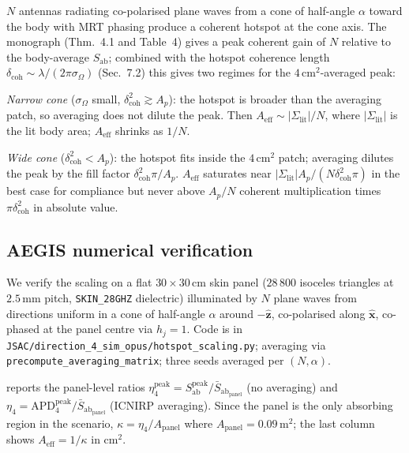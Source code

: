 \documentclass[journal]{IEEEtran}
\newcommand{\Sab}{S_{\mathrm{ab}}}
\newcommand{\APD}{\mathrm{APD}}
\newcommand{\Aeff}{A_{\mathrm{eff}}}
\begin{document}
$N$ antennas radiating co-polarised plane waves from a cone of
half-angle $\alpha$ toward the body with MRT phasing produce a
coherent hotspot at the cone axis. The monograph
(Thm.~4.1 and Table~4) gives a peak coherent gain of $N$ relative to
the body-average $\Sab$; combined with the hotspot coherence length
$\delta_{\mathrm{coh}}\!\sim\!\lambda/(2\pi\sigma_\Omega)$ (Sec.~7.2)
this gives two regimes for the $4\,\mathrm{cm}^2$-averaged peak:

\noindent\emph{Narrow cone} ($\sigma_\Omega$ small,
$\delta_{\mathrm{coh}}^2\!\gtrsim\!A_p$): the hotspot is broader than the
averaging patch, so averaging does not dilute the peak. Then
$\Aeff\!\sim\!|\Sigma_{\mathrm{lit}}|/N$, where
$|\Sigma_{\mathrm{lit}}|$ is the lit body area; $\Aeff$ shrinks as
$1/N$.

\noindent\emph{Wide cone} ($\delta_{\mathrm{coh}}^2\!<\!A_p$): the
hotspot fits inside the $4\,\mathrm{cm}^2$ patch; averaging dilutes
the peak by the fill factor $\delta_{\mathrm{coh}}^2\pi/A_p$.
$\Aeff$ saturates near $|\Sigma_{\mathrm{lit}}|A_p/(N\delta_{\mathrm{coh}}^2\pi)$
in the best case for compliance but never above $A_p/N$ coherent
multiplication times $\pi\delta_{\mathrm{coh}}^2$ in absolute value.

\subsection{AEGIS numerical verification}

We verify the scaling on a flat $30\!\times\!30$\,cm skin panel
($28\,800$ isoceles triangles at $2.5$\,mm pitch, \texttt{SKIN\_28GHZ}
dielectric) illuminated by $N$ plane waves from directions uniform in
a cone of half-angle $\alpha$ around $-\hat{\bm z}$, co-polarised
along $\hat{\bm x}$, co-phased at the panel centre via
$h_j\!=\!1$. Code is in
\verb|JSAC/direction_4_sim_opus/hotspot_scaling.py|; averaging via
\texttt{precompute\_averaging\_matrix}; three seeds averaged per
$(N,\alpha)$.

 reports the panel-level ratios $\eta_4^{\mathrm{peak}}\!=\!\Sab^{\mathrm{peak}}/\bar\Sab_{\mathrm{panel}}$
(no averaging) and $\eta_4\!=\!\APD_4^{\mathrm{peak}}/\bar\Sab_{\mathrm{panel}}$
(ICNIRP averaging). Since the panel is the only absorbing region in
the scenario, $\kappa = \eta_4/A_{\mathrm{panel}}$ where
$A_{\mathrm{panel}}\!=\!0.09\,\mathrm{m}^2$; the last column shows
$\Aeff\!=\!1/\kappa$ in cm$^2$.
\end{document}
